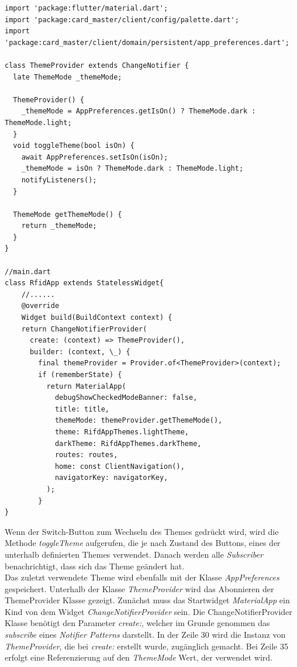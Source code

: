 \begin{lstlisting}[caption=Verwendung ThemeProvider Klasse,style=goMono]
import 'package:flutter/material.dart';
import 'package:card_master/client/config/palette.dart';
import 'package:card_master/client/domain/persistent/app_preferences.dart';

class ThemeProvider extends ChangeNotifier {
  late ThemeMode _themeMode;

  ThemeProvider() {
    _themeMode = AppPreferences.getIsOn() ? ThemeMode.dark : ThemeMode.light;
  }
  void toggleTheme(bool isOn) {
    await AppPreferences.setIsOn(isOn);
    _themeMode = isOn ? ThemeMode.dark : ThemeMode.light;
    notifyListeners();
  }

  ThemeMode getThemeMode() {
    return _themeMode;
  }
}

//main.dart
class RfidApp extends StatelessWidget{
    //......
    @override
    Widget build(BuildContext context) {
    return ChangeNotifierProvider(
      create: (context) => ThemeProvider(),
      builder: (context, \_) {
        final themeProvider = Provider.of<ThemeProvider>(context);
        if (rememberState) {
          return MaterialApp(
            debugShowCheckedModeBanner: false,
            title: title,
            themeMode: themeProvider.getThemeMode(),
            theme: RifdAppThemes.lightTheme,
            darkTheme: RifdAppThemes.darkTheme,
            routes: routes,
            home: const ClientNavigation(),
            navigatorKey: navigatorKey,
          );
        }
}
\end{lstlisting}

\newpage

Wenn der Switch-Button zum Wechseln des Themes gedrückt wird, wird die Methode {\textit{toggleTheme}} aufgerufen, die je nach Zustand des Buttons, eines der unterhalb definierten Themes verwendet. Danach werden alle {\textit{Subscriber}} benachrichtigt, dass sich das Theme geändert hat.\\

Das zuletzt verwendete Theme wird ebenfalls mit der Klasse {\textit{AppPreferences}} gespeichert. Unterhalb der Klasse {\textit{ThemeProvider}} wird das Abonnieren der ThemeProvider Klasse gezeigt. Zunächst muss das Startwidget {\textit{MaterialApp}} ein Kind von dem Widget {\textit{ChangeNotifierProvider}} sein. Die ChangeNotifierProvider Klasse benötigt den Parameter {\textit{create:}}, welcher im Grunde genommen das {\textit{subscribe}} eines {\textit{Notifier Patterns}} darstellt. In der Zeile 30 wird die Instanz von {\textit{ThemeProvider}}, die bei {\textit{create:}} erstellt wurde, zugänglich gemacht. Bei Zeile 35 erfolgt eine Referenzierung auf den {\textit{ThemeMode}} Wert, der verwendet wird.


